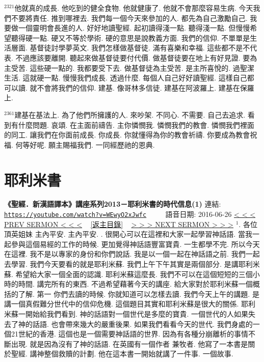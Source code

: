 \documentclass{book}
\begin{document}
$^{2321}$他就真的成長.
他吃到的健全食物.
他就健康了.
他就不會那麼容易生病.
今天我們不要將責任.
推到哪裡去.
我們每一個今天來參加的人.
都先為自己激勵自己.
我要做一個靈明會長進的人.
好好地讀聖經.
起初讀得淺一點.
聽得淺一點.
但慢慢希望聽得硬一點.
硬又不等於學術.
硬的意思是說教義方面.
我們的信仰.
不單單是生活層面.
基督徒討學夢英文.
我們怎樣做基督徒.
滿有喜樂和幸福.
這些都不是不代表.
不過應該要離開.
聽起來做基督徒要付代價.
做基督徒要在地上有好見證.
要為主受苦.
這些硬一點的.
我都要受下去.
做基督徒為主受苦.
是主所喜悅的.
過聖潔生活.
這就硬一點.
慢慢我們成長.
透過什麼.
每個人自己好好讀聖經.
這樣自己都可以讀.
就不會將我們的信仰.
建基.
像哥林多信徒.
建基在阿波羅上.
建基在保羅上.

$^{2361}$建基在基法上.
為了他們所擁護的人.
來吵架.
不同心.
不需要.
自己去追求.
看到有什麼問題.
哀頌.
在主面前禱告.
主你憐憫我.
憐憫我們的教會.
憐憫我們裡面的同工.
讓我們在你面前成長.
你成長.
你就懂得為你的教會祈禱.
你要成為教會祝福.
何等好呢.
願主賜福我們.
一同經歷祂的恩典.
\newpage



\section{耶利米書}
\label{sec:WEwyO2xJwfc}
\textbf{《聖經．新漢語譯本》講座系列2013－耶利米書的時代信息(1)}
\newline
\newline
連結: \href{https://youtube.com/watch?v=WEwyO2xJwfc}{\texttt{https://youtube.com/watch?v=WEwyO2xJwfc}} ~~~~ 語音日期: 2016-06-26
\newline
\newline
\hyperref[sec:L7Klx5S64nM]{\small{< < < PREV SERMON < < <}}
~
\hyperref[sec:index]{\small{[返主目錄]}}
~
\hyperref[sec:7tQS0En6sh8]{\small{> > > NEXT SERMON > > >}}
\newline
\newline
$^{1}$.
各位頂英姐妹 主內平安.
主內平安.
.
很開心可以在這裡和大家一起學習神話語.
當我一起參與這個易經的工作的時候.
更加覺得神話語豐富寶貴.
一生都學不完.
所以今天在這裡.
我不是以專家的身份和你們說話.
我是以一個一起在神話語之前.
我們一起去學習.
我們今天要看的就是耶利米蘇.
我們上午下午其實是兩個部分.
是講耶利米蘇.
希望給大家一個全面的認識.
耶利米蘇這麼長.
我們不可以在這個短短的三個小時的時間.
講完所有的東西.
不過希望藉著今天的講座.
給大家對於耶利米蘇一個概括的了解.
第一 你們去讀的時候.
你就知道可以怎樣去讀.
我們今天上午的講題.
是講一個真假難分世代中的信仰危機.
這個題目其實和耶利米蘇是很大的關係.
耶利米蘇一開始給我們看到.
神的話語對一個世代是多麼的寶貴.
一個世代的人如果失去了神的話語.
也會帶來幾大的嚴重後果.
如果我們看看今天的世代.
我們身處的一個21世紀的香港.
這個也是一個需要神話語的世界.
因為有各種分崩離析的事情不斷出現.
就是因為沒有了神的話語.
在英國有一個作者 兼牧者.
他寫了一本書是關於聖經.
講神整個救贖的計劃.
他在這本書一開始就講了一件事.
一個故事.
\end{document}
